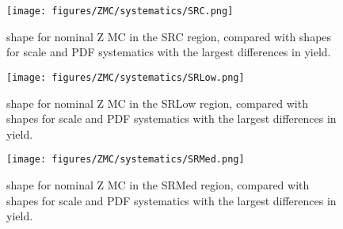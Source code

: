 \begin{figure}[tbhp]
\centering
\texttt{[image: figures/ZMC/systematics/SRC.png]}
\caption{
\mindphijm shape for nominal Z MC in the SRC region, compared with shapes for scale and PDF systematics with the largest differences in yield.
}
\label{fig:mindphijm_SRC} 
\end{figure} 

\begin{figure}[tbhp]
\centering
\texttt{[image: figures/ZMC/systematics/SRLow.png]}
\caption{
\mindphijm shape for nominal Z MC in the SRLow region, compared with shapes for scale and PDF systematics with the largest differences in yield.
}
\label{fig:mindphijm_SRLow} 
\end{figure} 

\begin{figure}[tbhp]
\centering
\texttt{[image: figures/ZMC/systematics/SRMed.png]}
\caption{
\mindphijm shape for nominal Z MC in the SRMed region, compared with shapes for scale and PDF systematics with the largest differences in yield.
}
\label{fig:mindphijm_SRMed} 
\end{figure} 